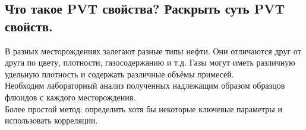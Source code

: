 

\subsection{Что такое PVT свойства? Раскрыть суть PVT свойств.}

В разных месторождениях залегают разные типы нефти.
Они отличаются друг от друга по цвету, плотности, газосодержанию и т.д.
Газы могут иметь различную удельную плотность и содержать различные объёмы примесей.
\\

Необходим лабораторный анализ полученных надлежащим образом образцов флюидов с каждого месторождения.
\\

Более простой метод: определить хотя бы некоторые ключевые параметры и использовать корреляции.

